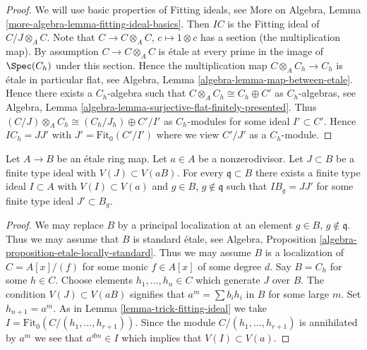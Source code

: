 \begin{proof}
We will use basic properties of Fitting ideals, see
More on Algebra, Lemma \ref{more-algebra-lemma-fitting-ideal-basics}.
Then $IC$ is the Fitting ideal of $C/J \otimes_A C$.
Note that $C \to C \otimes_A C$, $c \mapsto 1 \otimes c$ has a section
(the multiplication map). By assumption $C \to C \otimes_A C$ is \'etale
at every prime in the image of $\Spec(C_h)$ under this section.
Hence the multiplication map $C \otimes_A C_h \to C_h$ is \'etale
in particular flat, see Algebra, Lemma \ref{algebra-lemma-map-between-etale}.
Hence there exists a $C_h$-algebra such that
$C \otimes_A C_h \cong C_h \oplus C'$ as $C_h$-algebras, see
Algebra, Lemma \ref{algebra-lemma-surjective-flat-finitely-presented}.
Thus $(C/J) \otimes_A C_h \cong (C_h/J_h) \oplus C'/I'$ as
$C_h$-modules for some ideal $I' \subset C'$.
Hence $IC_h = JJ'$ with $J' = \text{Fit}_0(C'/I')$ where we view
$C'/J'$ as a $C_h$-module.
\end{proof}

\begin{lemma}
\label{lemma-push-ideal}
Let $A \to B$ be an \'etale ring map. Let $a \in A$ be a nonzerodivisor.
Let $J \subset B$ be a finite type ideal with $V(J) \subset V(aB)$.
For every $\mathfrak q \subset B$ there exists a finite type ideal
$I \subset A$ with $V(I) \subset V(a)$ and
$g \in B$, $g \not \in \mathfrak q$ such that
$IB_g = JJ'$ for some finite type ideal $J' \subset B_g$.
\end{lemma}

\begin{proof}
We may replace $B$ by a principal localization at
an element $g \in B$, $g \not \in \mathfrak q$. Thus we may assume
that $B$ is standard \'etale, see
Algebra, Proposition \ref{algebra-proposition-etale-locally-standard}.
Thus we may assume $B$ is a localization
of $C = A[x]/(f)$ for some monic $f \in A[x]$ of some degree $d$.
Say $B = C_h$ for some $h \in C$. Choose elements $h_1, \ldots, h_n \in C$
which generate $J$
over $B$. The condition $V(J) \subset V(aB)$ signifies that
$a^m = \sum b_i h_i$ in $B$ for some large $m$. Set $h_{n + 1} = a^m$.
As in Lemma \ref{lemma-trick-fitting-ideal} we take
$I = \text{Fit}_0(C/(h_1, \ldots, h_{r + 1}))$.
Since the module $C/(h_1, \ldots, h_{r + 1})$
is annihilated by $a^m$ we see that $a^{dm} \in I$ which implies
that $V(I) \subset V(a)$.
\end{proof}

